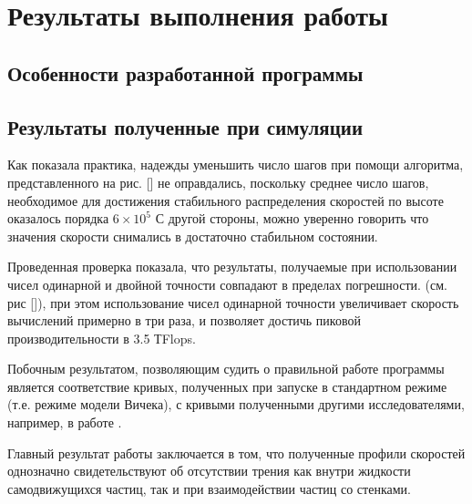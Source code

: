 \section{Результаты выполнения работы} %
\label{sec:WorkResults}	
    \subsection{Особенности разработанной программы} %
    \label{sub:ProgrammFetures}
        

    \subsection{Результаты полученные при симуляции} %
    \label{sub:ProgrammResults}
        Как показала практика, надежды уменьшить число шагов при помощи алгоритма, представленного на рис. [] не оправдались, поскольку среднее число шагов, необходимое для достижения стабильного распределения скоростей по высоте оказалось порядка $6 \times 10^5$ С другой стороны, можно уверенно говорить что значения скорости снимались в достаточно стабильном состоянии.

        Проведенная проверка показала, что результаты, получаемые при использовании чисел одинарной и двойной точности совпадают в пределах погрешности. (см. рис []), при этом использование чисел одинарной точности увеличивает скорость вычислений примерно в три раза, и позволяет достичь пиковой производительности в 3.5 ТFlops.

        Побочным результатом, позволяющим судить о правильной работе программы является соответствие кривых, полученных при запуске в стандартном режиме (т.е. режиме модели Вичека), с кривыми полученными другими исследователями, например, в работе \cite{vicsek1995}.

        Главный результат работы заключается в том, что полученные профили скоростей однозначно свидетельствуют об отсутствии трения как внутри жидкости самодвижущихся частиц, так и при взаимодействии частиц со стенками. 

